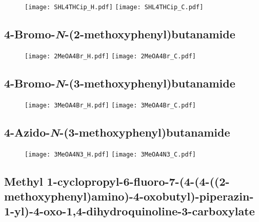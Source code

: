 \begin{figure}[H]
	\centering
		\texttt{[image: SHL4THCip\_H.pdf]}
		\texttt{[image: SHL4THCip\_C.pdf]}
\end{figure}

\subsection{4\hyp{}Bromo\hyp{}\textit{N}\hyp{}(2\hyp{}methoxyphenyl)butanamide }

\begin{figure}[H]
	\centering
		\texttt{[image: 2MeOA4Br\_H.pdf]}
		\texttt{[image: 2MeOA4Br\_C.pdf]}
\end{figure}

\subsection{4\hyp{}Bromo\hyp{}\textit{N}\hyp{}(3\hyp{}methoxyphenyl)butanamide }

\begin{figure}[H]
	\centering
		\texttt{[image: 3MeOA4Br\_H.pdf]}
		\texttt{[image: 3MeOA4Br\_C.pdf]}
\end{figure}

\subsection{4\hyp{}Azido\hyp{}\textit{N}\hyp{}(3\hyp{}methoxyphenyl)butanamide }

\begin{figure}[H]
	\centering
		\texttt{[image: 3MeOA4N3\_H.pdf]}
		\texttt{[image: 3MeOA4N3\_C.pdf]}
\end{figure}

\subsection{Methyl 1\hyp{}cyclopropyl\hyp{}6\hyp{}fluoro\hyp{}7\hyp{}(4\hyp{}(4\hyp{}((2\hyp{}methoxyphenyl)amino)\hyp{}4\hyp{}oxobutyl)\hyp{}piperazin\hyp{}1\hyp{}yl)\hyp{}4\hyp{}oxo\hyp{}1,4\hyp{}dihydroquinoline\hyp{}3\hyp{}carboxylate }

